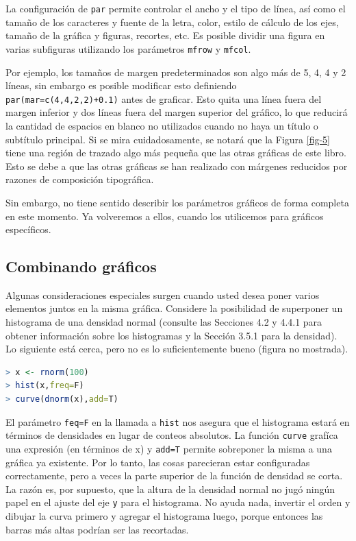 La configuración de \texttt{par} permite controlar el ancho y el tipo de línea,
así como el tamaño de los caracteres y fuente de la letra, color, estilo de
cálculo de los ejes, tamaño de la gráfica y figuras, recortes, etc. Es posible
dividir una figura en varias subfiguras utilizando los parámetros \texttt{mfrow}
y \texttt{mfcol}.

Por ejemplo, los tamaños de margen predeterminados son algo más de 5, 4, 4 y 2
líneas, sin embargo es posible modificar esto definiendo \texttt{par(mar=c(4,4,2,2)+0.1)} antes de graficar. Esto
quita una línea fuera del margen inferior y dos líneas fuera del margen superior
del gráfico, lo que reducirá la cantidad de espacios en blanco no utilizados
cuando no haya un título o subtítulo principal. Si se mira cuidadosamente, se
notará que la Figura \ref{fig-5} tiene una región de trazado algo más
pequeña que las otras gráficas de este libro. Esto se debe a que las otras
gráficas se han realizado con márgenes reducidos por razones de composición
tipográfica.

Sin embargo, no tiene sentido describir los parámetros gráficos de forma
completa en este momento. Ya volveremos a ellos, cuando los utilicemos
para gráficos específicos.

\subsection{Combinando gráficos}\label{combigraf}

Algunas consideraciones especiales surgen cuando usted desea poner varios
elementos juntos en la misma gráfica. Considere la posibilidad de superponer un
histograma de una densidad normal (consulte las Secciones 4.2 y 4.4.1 para
obtener información sobre los histogramas y la Sección 3.5.1 para la densidad).
Lo siguiente está cerca, pero no es lo suficientemente bueno (figura no
mostrada).

\begin{lstlisting}[language=R]
> x <- rnorm(100)
> hist(x,freq=F)
> curve(dnorm(x),add=T)
\end{lstlisting}

El parámetro \texttt{feq=F} en la llamada a \texttt{hist} nos asegura que el
histograma estará en términos de densidades en lugar de conteos absolutos.  La
función \texttt{curve} grafíca una expresión (en términos de x) y \texttt{add=T}
permite sobreponer la misma a una gráfica ya existente.  Por lo tanto, las cosas
parecieran estar configuradas correctamente, pero a veces la parte superior de
la función de densidad se corta. La razón es, por supuesto, que la altura de la
densidad normal no jugó ningún papel en el ajuste del eje \texttt{y} para el
histograma. No ayuda nada,  invertir el orden y dibujar la curva primero y
agregar el histograma luego, porque entonces las barras más altas podrían ser
las recortadas.

